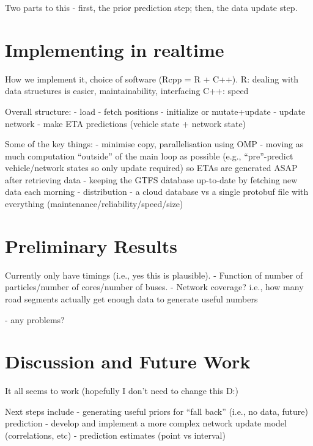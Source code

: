 \documentclass[times, doublespace]{anzsauth}
\begin{document}
Two parts to this - first, the prior prediction step; then, the data update step.


\section{Implementing in realtime}
\label{sec:rt}

How we implement it, choice of software (Rcpp = R + C++).
R: dealing with data structures is easier, maintainability, interfacing
C++: speed

Overall structure:
- load
- fetch positions
- initialize or mutate+update
- update network
- make ETA predictions (vehicle state + network state)

Some of the key things:
- minimise copy, parallelisation using OMP
- moving as much computation ``outside'' of the main loop as possible
  (e.g., ``pre''-predict vehicle/network states so only update required)
  so ETAs are generated ASAP after retrieving data
- keeping the GTFS database up-to-date by fetching new data each morning
- distribution - a cloud database vs a single protobuf file with everything 
  (maintenance/reliability/speed/size)


\section{Preliminary Results}
\label{sec:results}

Currently only have timings (i.e., yes this is plausible).
- Function of number of particles/number of cores/number of buses.
- Network coverage? i.e., how many road segments actually get enough data
to generate useful numbers

- any problems?


\section{Discussion and Future Work}
\label{sec:discussion}

It all seems to work (hopefully I don't need to change this D:)

Next steps include
- generating useful priors for ``fall back'' (i.e., no data, future) prediction
- develop and implement a more complex network update model (correlations, etc)
- prediction estimates (point vs interval)

\cite{Hans_2015}




\end{document}
